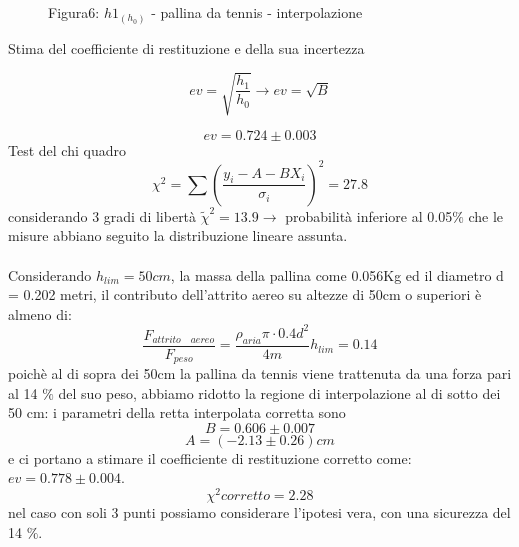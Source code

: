 \documentclass[a4paper]{article}
\theoremstyle{definition}
\begin{document}
	\begin{figure}[!ht]
				\captionsetup{labelformat=empty}
		\captionsetup{labelformat=empty}
	\caption{Figura6: \(h1_{(h_{0})}\) - pallina da tennis - interpolazione}
	\end{figure}

	\noindent Stima del coefficiente di restituzione e della sua incertezza
	
	\[ev = \sqrt{\frac{h_{1}}{h_{0}}} \rightarrow ev = \sqrt{B}\]

	\[ev = 0.724 \pm 0.003\]
\noindent Test del chi quadro\\
\[\chi ^{2} = \sum \left ( \frac{y_{i}-A-BX_{i}}{\sigma_{i}} \right )^{2} = 27.8\]
\noindent considerando 3 gradi di libertà \(\tilde{\chi}^{2} = 13.9 \rightarrow \) probabilità inferiore al 0.05\(\%\) che le misure abbiano seguito la distribuzione lineare assunta.\\\\
Considerando \(h_{lim} = 50 cm\), la massa della pallina come 0.056Kg ed il diametro d = 0.202 metri, il contributo dell'attrito aereo su altezze di 50cm o superiori è almeno di:
\[\frac{F_{attrito \quad aereo}}{F_{peso}} = \frac{\rho_{aria} \pi \cdot 0.4 d^{2}}{4m}h_{lim} =  0.14\]
poichè al di sopra dei 50cm la pallina da tennis viene trattenuta da una forza pari al 14 \(\%\) del suo peso, abbiamo ridotto la regione di interpolazione al di sotto dei 50 cm: i parametri della retta interpolata corretta sono
\[B =0.606 \pm 0.007\]
\[A =(-2.13 \pm 0.26) cm\]
e ci portano a stimare il coefficiente di restituzione corretto come: \(ev =  0.778 \pm 0.004\).
\[\chi ^{2}corretto = 2.28\]
nel caso con soli 3 punti possiamo considerare l'ipotesi vera, con una sicurezza del 14 \(\%\).\\
\end{document}
